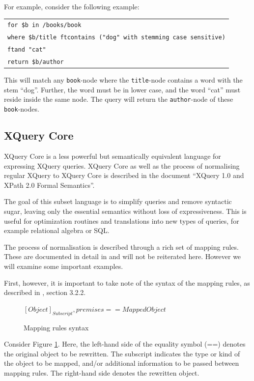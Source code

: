 \newpage
For example, consider the following example:
\begin{center}
\begin{tabular}{l}
\texttt{for \$b in /books/book} \\
\texttt{where \$b/title ftcontains ("dog" with stemming case sensitive)} \\ \quad\quad\quad
\texttt{ftand "cat"} \\
\texttt{return \$b/author}
\end{tabular}
\end{center}
This will match any \texttt{book}-node where the \texttt{title}-node contains a word with the stem ``dog''.
Further, the word must be in lower case, and the word ``cat'' must reside inside the same node. The query will
return the \texttt{author}-node of these \texttt{book}-nodes. 

\subsection{XQuery Core}
\label{sect:theory:xquery:XQcore}
XQuery Core is a less powerful but semantically equivalent language for expressing
XQuery queries. XQuery Core as well as the process of normalising regular
XQuery to XQuery Core is described in the document ``XQuery 1.0 and XPath 2.0
Formal Semantics''\cite{xquery_semantics}.

The goal of this subset language is to simplify queries and remove syntactic sugar,
leaving only the essential semantics without loss of expressiveness.
This is useful for optimization routines and translations into new types of
queries, for example relational algebra or SQL.

The process of normalisation is described through a rich set of mapping
rules. These are documented in detail in \cite{xquery_semantics} and will not be reiterated here.
However we will examine some important examples.

First, however, it is important to take note of the syntax of the mapping
rules, as described in \cite{xquery_semantics}, section 3.2.2. 
 
\begin{figure}[!h]
  \centering
$
[Object]_{Subscript}, premises == Mapped Object
$
  \caption{Mapping rules syntax}
  \label{figure:xquery:mapping_rules}
\end{figure}

Consider Figure \ref{figure:xquery:mapping_rules}. Here, the left-hand side of the
equality symbol (==) denotes the original object to be rewritten. The
subscript indicates the type or kind of the object to be mapped, and/or
additional information to be passed between mapping rules. The right-hand side
denotes the rewritten object.

